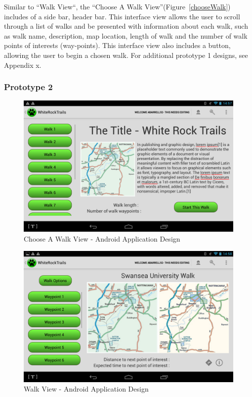 \documentclass[11pt,a4paper]{article}
\begin{document}
Similar to ``Walk View``, the ``Choose A Walk View''(Figure~\ref{chooseWalk}) includes of a side bar, header bar. This interface view allows the user to scroll through a list of walks and be presented with information about each walk, such as walk name, description, map location, length of walk and the number of walk points of interests (way-points). This interface view also includes a button, allowing the user to begin a chosen walk. For additional prototype 1 designs, see Appendix x.

\subsubsection{Prototype 2}

\begin{figure}[h!]
\begin{center}
\includegraphics[width=12cm]{./img/app_choose_walk.png}
\caption{Choose A Walk View - Android Application Design}
\end{center}
\end{figure}


\begin{figure}[h!]
\begin{center}
\includegraphics[width=12cm]{./img/app_walk_view.png}
\caption{Walk View - Android Application Design}
\end{center}
\end{figure}
\end{document}
